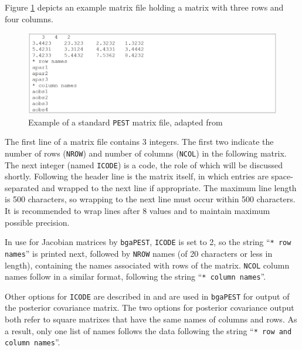 \documentclass[11pt,oneside,onecolumn]{usgsreport}
\begin{document}
\begin{appendix}
\begin{bibunit}
Figure \ref{fig:matrix} depicts an example matrix file holding a
matrix with three rows and four columns.

\begin{figure}[!t]
\begin{centering}
\includegraphics[scale=0.25]{figures/standard_PEST_matrix}
\caption{Example of a standard \texttt{PEST} matrix file, adapted from \citet{PESTAdd}}
\label{fig:matrix}
\end{centering}
\end{figure}


The first line of a matrix file contains 3 integers. The first two
indicate the number of rows (\texttt{NROW}) and number of columns
(\texttt{NCOL}) in the following matrix. The next integer (named \texttt{ICODE})
is a code, the role of which will be discussed shortly. Following
the header line is the matrix itself, in which entries are space-separated
and wrapped to the next line if appropriate. The maximum line length
is 500 characters, so wrapping to the next line must occur within
500 characters. It is recommended to wrap lines after 8 values and
to maintain maximum possible precision.

In use for Jacobian matrices by \texttt{bgaPEST}, \texttt{ICODE} is
set to 2, so the string \textquotedblleft{}\texttt{{*} row names}\textquotedblright{}
is printed next, followed by \texttt{NROW} names (of 20 characters
or less in length), containing the names associated with rows of the
matrix. \texttt{NCOL} column names follow in a similar format, following
the string \textquotedblleft{}\texttt{{*} column names}\textquotedblright{}. 

Other options for \texttt{ICODE} are described in \citet{PESTAdd}
and are used in \texttt{bgaPEST} for output of the posterior covariance
matrix. The two options for posterior covariance output both refer
to square matrixes that have the same names of columns and rows. As
a result, only one list of names follows the data following the string
\textquotedblleft{}\texttt{{*} row and column names}\textquotedblright{}. 


\end{bibunit}
\end{appendix}
\end{document}
